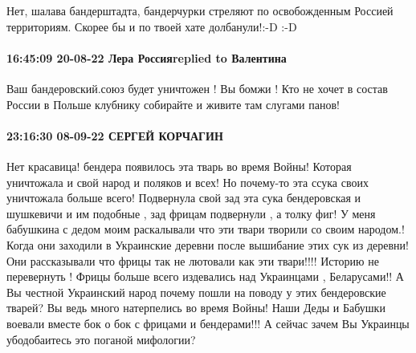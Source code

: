Нет, шалава бандерштадта, бандерчурки стреляют по освобожденным Россией территориям.
Скорее бы и по твоей хате долбанули!:-D :-D

\paragraph{16:45:09 20-08-22 Лера Россияreplied to Валентина}

Ваш бандеровский.союз будет уничтожен ! Вы бомжи ! Кто не хочет в состав России
в Польше клубнику собирайте и живите там слугами панов!

\paragraph{23:16:30 08-09-22 СЕРГЕЙ КОРЧАГИН}

Нет красавица! бендера появилось эта тварь во время Войны! Которая уничтожала и
свой народ и поляков и всех! Но почему-то эта ссука своих уничтожала больше
всего! Подвернула свой зад эта сука бендеровская и шушкевичи и им подобные ,
зад фрицам подвернули , а толку фиг! У меня бабушкина с дедом моим раскалывали
что эти твари творили со своим народом.! Когда они заходили в Украинские
деревни после вышибание этих сук из деревни! Они рассказывали что фрицы так не
лютовали как эти твари!!!! Историю не перевернуть ! Фрицы больше всего
издевались над Украинцами , Беларусами!! А Вы честной Украинский народ почему
пошли на поводу у этих бендеровские тварей? Вы ведь много натерпелись во время
Войны! Наши Деды и Бабушки воевали вместе бок о бок с фрицами и бендерами!!! А
сейчас зачем Вы Украинцы убодобаитесь это поганой мифологии?


